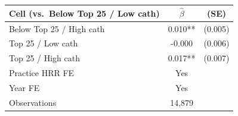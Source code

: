 
\begin{tabular}{lcc}
\toprule
Cell (vs.\ Below Top 25 / Low cath) & $\hat{\beta}$ & (SE)\\
\midrule
Below Top 25 / High cath & 0.010** & (0.005)\\
Top 25 / Low cath & -0.000 & (0.006)\\
Top 25 / High cath & 0.017** & (0.007)\\
\midrule
Practice HRR FE & Yes & \\
Year FE & Yes & \\
Observations & 14,879 & \\
\bottomrule
\end{tabular}

